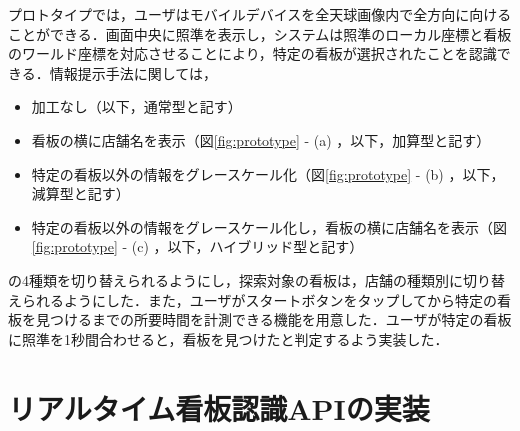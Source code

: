   プロトタイプでは，ユーザはモバイルデバイスを全天球画像内で全方向に向けることができる．画面中央に照準を表示し，システムは照準のローカル座標と看板のワールド座標を対応させることにより，特定の看板が選択されたことを認識できる．情報提示手法に関しては，
  \begin{itemize}
    \item 加工なし（以下，通常型と記す）
    \item 看板の横に店舗名を表示（図\ref{fig:prototype} - (a) ，以下，加算型と記す）
    \item 特定の看板以外の情報をグレースケール化（図\ref{fig:prototype} - (b) ，以下，減算型と記す）
    \item 特定の看板以外の情報をグレースケール化し，看板の横に店舗名を表示（図\ref{fig:prototype} - (c) ，以下，ハイブリッド型と記す）
  \end{itemize}
  の4種類を切り替えられるようにし，探索対象の看板は，店舗の種類別に切り替えられるようにした．また，ユーザがスタートボタンをタップしてから特定の看板を見つけるまでの所要時間を計測できる機能を用意した．ユーザが特定の看板に照準を1秒間合わせると，看板を見つけたと判定するよう実装した．

\section{リアルタイム看板認識APIの実装}

